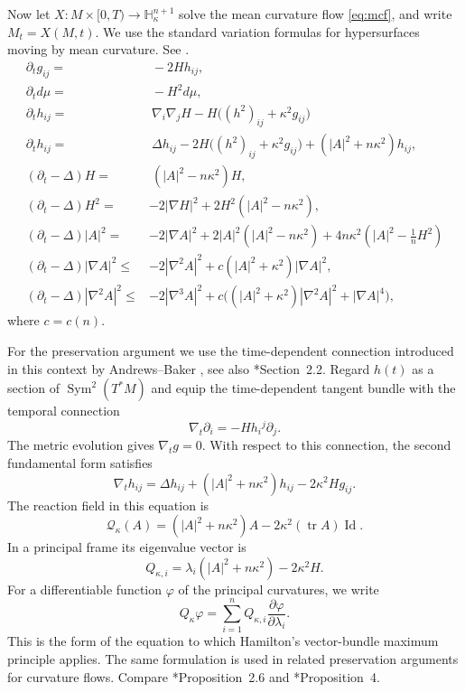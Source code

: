 \documentclass[11pt,reqno]{amsart}
\theoremstyle{definition}
\theoremstyle{remark}
\numberwithin{equation}{section}
\newcommand{\Hh}{\mathbb H}
\newcommand{\tr}{\operatorname{tr}}
\newcommand{\Id}{\operatorname{Id}}
\begin{document}
Now let $X:M\times[0,T)\longrightarrow\Hh^{n+1}_{\kappa}$
solve the mean curvature flow \eqref{eq:mcf}, and write
$M_t=X(M,t)$.  We use the standard variation formulas for hypersurfaces
moving by mean curvature.   See \cite{Ecker04,HS09,Hui86,AC17,LN21}.
\begin{align}
 \partial_tg_{ij}=&~-2Hh_{ij},\nonumber\\
 \partial_t d\mu=&~-H^2d\mu, \label{s2.evl-dmu}\\
    \partial_th_{ij}
 =&~\nabla_i\nabla_jH-H\bigl((h^2)_{ij}+\kappa^2g_{ij}\bigr)\nonumber\\
 \partial_th_{ij}  =&~\Delta h_{ij}-2H\bigl((h^2)_{ij}+\kappa^2g_{ij}\bigr)
  +(|A|^2+n\kappa^2)h_{ij},\label{eq:h-direct-evolution}\\
 (\partial_t-\Delta)H=&~(|A|^2-n\kappa^2)H,\label{eq:H-evol}\\
 (\partial_t-\Delta)H^2=&-2|\nabla H|^2
   +2H^2(|A|^2-n\kappa^2),\label{eq:H2-evol}\\
 (\partial_t-\Delta)|A|^2=&-2|\nabla A|^2
   +2|A|^2(|A|^2-n\kappa^2)
   +4n\kappa^2\left(|A|^2-\frac1nH^2\right)\label{eq:A2-evol}\\
 (\partial_t-\Delta)|\nabla A|^2
 \leq&-2|\nabla^2A|^2+c(|A|^2+\kappa^2)|\nabla A|^2,\label{eq:derivative-evolutions}\\
 (\partial_t-\Delta)|\nabla^2A|^2
 \leq&-2|\nabla^3A|^2
 +c\bigl((|A|^2+\kappa^2)|\nabla^2A|^2+|\nabla A|^4\bigr), \label{eq:derivative-evolutions-2}
\end{align}
where $c=c(n)$. 


For the preservation argument we use the time-dependent connection introduced in this context by Andrews--Baker \cite{AB10}, see also
\cite{LN21}*{Section~2.2}. Regard $h(t)$ as a section of
$\operatorname{Sym}^2(T^*M)$ and equip the time-dependent tangent bundle with the temporal connection
\begin{equation*}
 \nabla_t\partial_i=-Hh_i{}^j\partial_j.
\end{equation*}
The metric evolution gives $\nabla_t g=0$. With respect to this connection, the second fundamental form satisfies
\begin{equation}\label{eq:nabla-t-h}
 \nabla_th_{ij}=\Delta h_{ij}+(|A|^2+n\kappa^2)h_{ij}
 -2\kappa^2Hg_{ij}.
\end{equation}
The reaction field in this equation is
\begin{equation*}
 \mathcal Q_{\kappa}(A)=(|A|^2+n\kappa^2)A
 -2\kappa^2(\tr A)\Id.
\end{equation*}
In a principal frame its eigenvalue vector is
\begin{equation*}
 Q_{\kappa,i}=\lambda_i(|A|^2+n\kappa^2)-2\kappa^2H.
\end{equation*}
For a differentiable function $\varphi$ of the principal curvatures, we
write
\begin{equation*}
 Q_\kappa\varphi=\sum_{i=1}^nQ_{\kappa,i}
 \frac{\partial\varphi}{\partial\lambda_i}.
\end{equation*}
This is the form of the equation to which Hamilton's vector-bundle maximum principle \cite{Ham86} applies. The same formulation is used in related preservation arguments for curvature flows. Compare
\cite{HS09}*{Proposition~2.6} and \cite{AC17}*{Proposition~4}.
\end{document}
